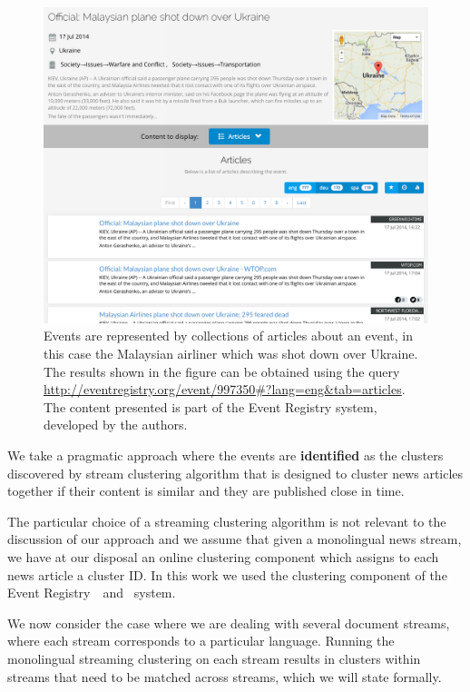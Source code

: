 \begin{figure}
\centering
\includegraphics[width=1\textwidth]{figures/events2.png}
\caption[An example of an event]{Events are represented by collections of articles about an event, in
this case the Malaysian airliner which was shot down over Ukraine. The results shown in the figure can be obtained using the query \url{http://eventregistry.org/event/997350\#?lang=eng\&tab=articles}. The
content presented is part of the Event Registry system, developed by the authors.}
\label{fig:event2} 
\end{figure}


We take a pragmatic approach where the events are \textbf{identified} as the clusters
discovered by stream clustering algorithm that is designed to cluster
news articles together if their content is similar and they are published
close in time.

The particular choice of a streaming clustering algorithm is not relevant
to the discussion of our approach and we assume that given a monolingual news stream, we have
at our disposal an online clustering component which assigns to each news
article a cluster ID. In this work we used the clustering
component of the Event Registry~\cite{Leban2014W}~and~\cite{Leban2014I} system.

We now consider the case where we are dealing with several document streams, where each
stream corresponds to a particular language. Running the monolingual streaming clustering
on each stream results in clusters within streams that need to be matched across streams,
which we will state formally.

